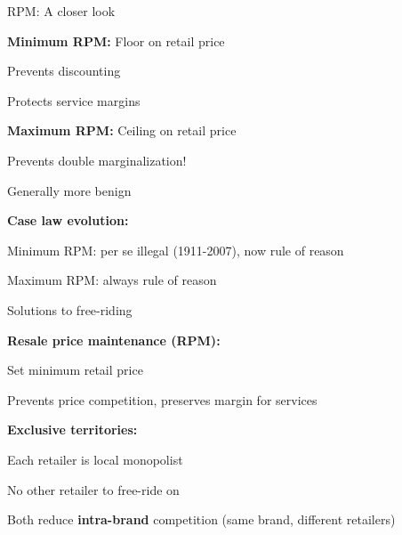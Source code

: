 \documentclass[notes,11pt, aspectratio=169]{beamer}
\newenvironment{wideitemize}{\itemize\addtolength{\itemsep}{10pt}}{\enditemize}
\begin{document}
\begin{frame}{RPM: A closer look}
	\begin{wideitemize}
		\item \textbf{Minimum RPM:} Floor on retail price
		\begin{wideitemize}
			\vspace{5pt}
			\item Prevents discounting
			\item Protects service margins
		\end{wideitemize}
		\item \textbf{Maximum RPM:} Ceiling on retail price
		\begin{wideitemize}
			\vspace{5pt}
			\item Prevents double marginalization!
			\item Generally more benign
		\end{wideitemize}
		\item \textbf{Case law evolution:}
		\begin{wideitemize}
			\vspace{5pt}
			\item Minimum RPM: per se illegal (1911-2007), now rule of reason
			\item Maximum RPM: always rule of reason
		\end{wideitemize}
	\end{wideitemize}
\end{frame}

\begin{frame}{Solutions to free-riding}
	\begin{wideitemize}
		\item \textbf{Resale price maintenance (RPM):}
		\begin{wideitemize}
			\vspace{5pt}
			\item Set minimum retail price
			\item Prevents price competition, preserves margin for services
		\end{wideitemize}
		\item \textbf{Exclusive territories:}
		\begin{wideitemize}
			\vspace{5pt}
			\item Each retailer is local monopolist
			\item No other retailer to free-ride on
		\end{wideitemize}
		\item Both reduce \textbf{intra-brand} competition (same brand, different retailers)
	\end{wideitemize}
\end{frame}
\end{document}
